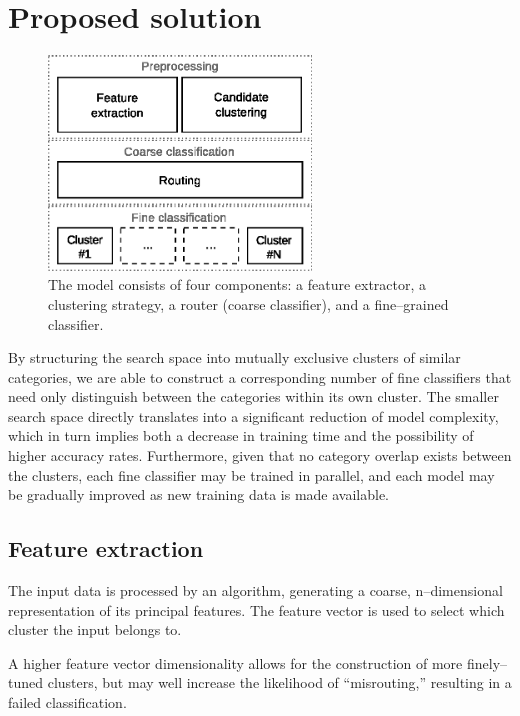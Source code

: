 \documentclass[10pt,conference,a4paper]{IEEEtran}
\begin{document}
	\section{Proposed solution}
	\label{sec:proposed_solution}

	\begin{figure}
		\centering
		\includegraphics[width=2.75in]{./fig/model-overview.eps}
		\caption{The model consists of four components: a feature extractor, a clustering strategy,
			a router (coarse classifier), and a fine--grained classifier.}
		\label{fig_model_overview}
	\end{figure}



	By structuring the search space into mutually exclusive clusters of similar categories,
	we are able to construct a corresponding number of fine classifiers that need only distinguish
	between the categories within its own cluster. The smaller search space directly translates into a
	significant reduction of model complexity, which in turn implies both a decrease in training time
	and the possibility of higher accuracy rates. Furthermore, given that no category overlap exists
	between the clusters, each fine classifier may be trained in parallel, and each model may be gradually
	improved as new training data is made available.




	\subsection{Feature extraction}

	The input data is processed by an algorithm, generating a coarse, n--dimensional representation of its principal features.
	The feature vector is used to select which cluster the input belongs to.
	

	A higher feature vector dimensionality allows for the construction of more finely--tuned clusters, but may well increase
	the likelihood of ``misrouting,'' resulting in a failed classification.
\end{document}
